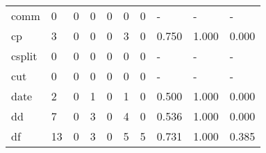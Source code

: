 \begin{longtable}{lp{1.3cm}p{1.3cm}p{1.3cm}p{1.3cm}p{1.3cm}p{1.3cm}p{1.3cm}p{1.3cm}p{1.3cm}}
comm      &                      0 &                                             0 &                                            0 &                                           0 &                                            0 &                                          0 &                                    - &                                      - &                                    - \\
cp        &                      3 &                                             0 &                                            0 &                                           0 &                                            3 &                                          0 &                                0.750 &                                  1.000 &                                0.000 \\
csplit    &                      0 &                                             0 &                                            0 &                                           0 &                                            0 &                                          0 &                                    - &                                      - &                                    - \\
cut       &                      0 &                                             0 &                                            0 &                                           0 &                                            0 &                                          0 &                                    - &                                      - &                                    - \\
date      &                      2 &                                             0 &                                            1 &                                           0 &                                            1 &                                          0 &                                0.500 &                                  1.000 &                                0.000 \\
dd        &                      7 &                                             0 &                                            3 &                                           0 &                                            4 &                                          0 &                                0.536 &                                  1.000 &                                0.000 \\
df        &                     13 &                                             0 &                                            3 &                                           0 &                                            5 &                                          5 &                                0.731 &                                  1.000 &                                0.385 \\

\end{longtable}
